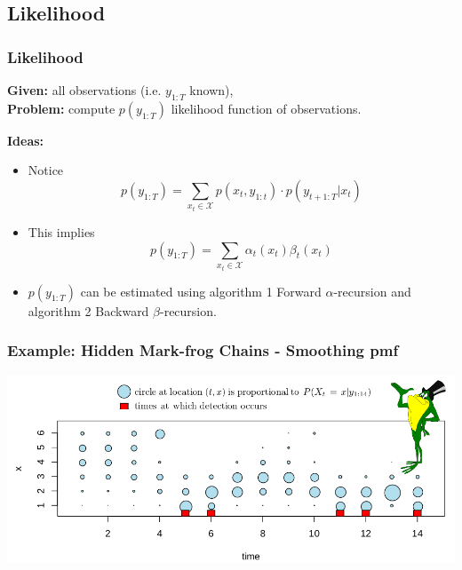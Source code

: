 \documentclass[xcolor=dvipsnames, compress]{beamer}
\begin{document}
\begin{frame}
\section{Likelihood}
\frametitle{Likelihood}

\textbf{Given:} all observations (i.e. $y_{1:T}$ known),\\
\textbf{Problem:} compute $p(y_{1:T})$ likelihood function of observations.

\vspace{0.5cm}

\textbf{Ideas:}

\begin{itemize}
	\item Notice $$p(y_{1:T} ) = \sum_{x_t \in \mathcal{X}} p(x_t , y_{1:t} ) \cdot p(y_{t+1:T} |x_t )$$
	\item This implies $$p(y_{1:T} ) = \sum_{x_t \in \mathcal{X}} \alpha_t(x_t) \beta_t(x_t) $$
	
	\item $p(y_{1:T} )$ can be estimated using algorithm 1 Forward $\alpha$-recursion and algorithm 2 Backward $\beta$-recursion.
	
\end{itemize}

\end{frame}


\begin{frame}
\frametitle{Example: Hidden Mark-frog Chains - Smoothing pmf}
\begin{center}
	\includegraphics[width=1.01\textwidth]{images/frog_smooth.png}
\end{center}
\end{frame}
\end{document}
